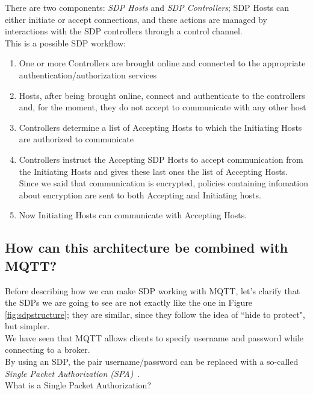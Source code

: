 \documentclass[12pt]{report}
\begin{document}
{{There are two components: \emph{SDP Hosts} and \emph{SDP Controllers}; SDP Hosts can either initiate or accept connections, and these actions are managed by interactions with the SDP controllers through a control channel.\\
This is a possible SDP workflow:

\begin{enumerate}
\item One or more Controllers are brought online and connected to the appropriate authentication/authorization services
\item Hosts, after being brought online, connect and authenticate to the controllers and, for the moment, they do not accept to communicate with any other host
\item Controllers determine a list of Accepting Hosts to which the Initiating Hosts are authorized to communicate
\item Controllers instruct the Accepting SDP Hosts to accept communication from the Initiating Hosts and gives these last ones the list of Accepting Hosts.\\
Since we said that communication is encrypted, policies containing infomation about encryption are sent to both Accepting and Initiating hosts.
\item Now Initiating Hosts can communicate with Accepting Hosts.\\
\end{enumerate}

\subsection{How can this architecture be combined with MQTT?}
\bigskip
Before describing how we can make SDP working with MQTT, let's clarify that the SDPs we are going to see are not exactly like the one in Figure \ref{fig:sdpstructure}; they are similar, since they follow the idea of ``hide to protect", but simpler.\\

We have seen that MQTT allows clients to specify username and password while connecting to a broker.\\By using an SDP, the pair username/password can be replaced with a so-called \emph{Single Packet Authorization (SPA)}~\cite{mqttonlywithsdp}.\\

What is a Single Packet Authorization?~\cite{portknockandspaanalysis}\\

}}
\end{document}
